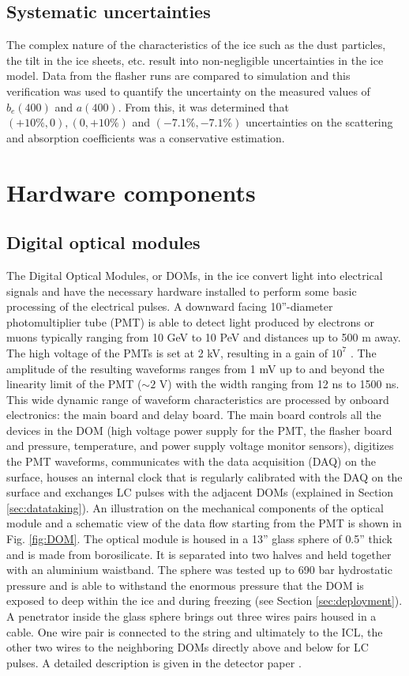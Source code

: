 \subsection{Systematic uncertainties}
The complex nature of the characteristics of the ice such as the dust particles, the tilt in the ice sheets, etc. result into non-negligible uncertainties in the ice model. Data from the flasher runs are compared to simulation and this verification was used to quantify the uncertainty on the measured values of $b_e(400)$ and $a(400)$. From this, it was determined that $(+10\%,0), (0,+10\%)$ and $(-7.1\%,-7.1\%)$ uncertainties on the scattering and absorption coefficients was a conservative estimation.

\section{Hardware components}
\subsection{Digital optical modules}
\label{subsec:doms}
The Digital Optical Modules, or DOMs, in the ice convert light into electrical signals and have the necessary hardware installed to perform some basic processing of the electrical pulses. A downward facing 10''-diameter photomultiplier tube (PMT) is able to detect light produced by electrons or muons typically ranging from 10 GeV to 10 PeV and distances up to 500 m away. The high voltage of the PMTs is set at 2 kV, resulting in a gain of $10^7$ \cite{Aartsen:2016nxy}. The amplitude of the resulting waveforms ranges from 1 mV up to and beyond the linearity limit of the PMT ($\sim2$ V) with the width ranging from 12 ns to 1500 ns. This wide dynamic range of waveform characteristics are processed by onboard electronics: the main board and delay board. The main board controls all the devices in the DOM (high voltage power supply for the PMT, the flasher board and pressure, temperature, and power supply voltage monitor sensors), digitizes the PMT waveforms, communicates with the data acquisition (DAQ) on the surface, houses an internal clock that is regularly calibrated with the DAQ on the surface and exchanges LC pulses with the adjacent DOMs (explained in Section \ref{sec:datataking}).
An illustration on the mechanical components of the optical module and a schematic view of the data flow starting from the PMT is shown in Fig. \ref{fig:DOM}. The optical module is housed in a 13'' glass sphere of 0.5'' thick and is made from borosilicate. It is separated into two halves and held together with an aluminium waistband. The sphere was tested up to 690 bar hydrostatic pressure and is able to withstand the enormous pressure that the DOM is exposed to deep within the ice and during freezing (see Section \ref{sec:deployment}). A penetrator inside the glass sphere brings out three wires pairs housed in a cable. One wire pair is connected to the string and ultimately to the ICL, the other two wires to the neighboring DOMs directly above and below for LC pulses. A detailed description is given in the detector paper \cite{Aartsen:2016nxy}.

